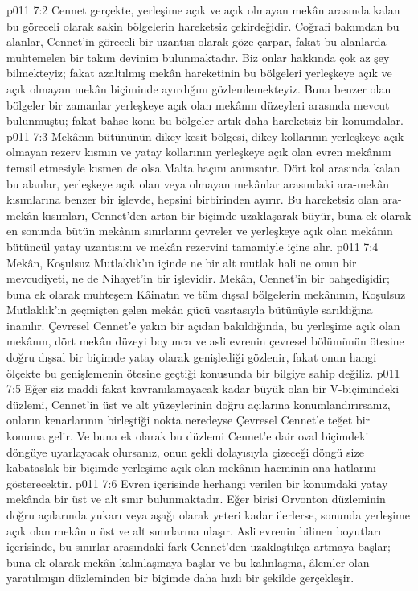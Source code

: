 \vs p011 7:2 Cennet gerçekte, yerleşime açık ve açık olmayan mekân arasında kalan bu göreceli olarak sakin bölgelerin hareketsiz çekirdeğidir. Coğrafi bakımdan bu alanlar, Cennet’in göreceli bir uzantısı olarak göze çarpar, fakat bu alanlarda muhtemelen bir takım devinim bulunmaktadır. Biz onlar hakkında çok az şey bilmekteyiz; fakat azaltılmış mekân hareketinin bu bölgeleri yerleşkeye açık ve açık olmayan mekân biçiminde ayırdığını gözlemlemekteyiz. Buna benzer olan bölgeler bir zamanlar yerleşkeye açık olan mekânın düzeyleri arasında mevcut bulunmuştu; fakat bahse konu bu bölgeler artık daha hareketsiz bir konumdalar.
\vs p011 7:3 Mekânın bütününün dikey kesit bölgesi, dikey kollarının yerleşkeye açık olmayan rezerv kısmın ve yatay kollarının yerleşkeye açık olan evren mekânını temsil etmesiyle kısmen de olsa Malta haçını anımsatır. Dört kol arasında kalan bu alanlar, yerleşkeye açık olan veya olmayan mekânlar arasındaki ara\hyp{}mekân kısımlarına benzer bir işlevde, hepsini birbirinden ayırır. Bu hareketsiz olan ara\hyp{}mekân kısımları, Cennet’den artan bir biçimde uzaklaşarak büyür, buna ek olarak en sonunda bütün mekânın sınırlarını çevreler ve yerleşkeye açık olan mekânın bütüncül yatay uzantısını ve mekân rezervini tamamiyle içine alır.
\vs p011 7:4 Mekân, Koşulsuz Mutlaklık’ın içinde ne bir alt mutlak hali ne onun bir mevcudiyeti, ne de Nihayet’in bir işlevidir. Mekân, Cennet’in bir bahşedişidir; buna ek olarak muhteşem Kâinatın ve tüm dışsal bölgelerin mekânının, Koşulsuz Mutlaklık’ın geçmişten gelen mekân gücü vasıtasıyla bütünüyle sarıldığına inanılır. Çevresel Cennet’e yakın bir açıdan bakıldığında, bu yerleşime açık olan mekânın, dört mekân düzeyi boyunca ve asli evrenin çevresel bölümünün ötesine doğru dışsal bir biçimde yatay olarak genişlediği gözlenir, fakat onun hangi ölçekte bu genişlemenin ötesine geçtiği konusunda bir bilgiye sahip değiliz.
\vs p011 7:5 Eğer siz maddi fakat kavranılamayacak kadar büyük olan bir V\hyp{}biçimindeki düzlemi, Cennet’in üst ve alt yüzeylerinin doğru açılarına konumlandırırsanız, onların kenarlarının birleştiği nokta neredeyse Çevresel Cennet’e teğet bir konuma gelir. Ve buna ek olarak bu düzlemi Cennet’e dair oval biçimdeki döngüye uyarlayacak olursanız, onun şekli dolayısıyla çizeceği döngü size kabataslak bir biçimde yerleşime açık olan mekânın hacminin ana hatlarını gösterecektir.
\vs p011 7:6 Evren içerisinde herhangi verilen bir konumdaki yatay mekânda bir üst ve alt sınır bulunmaktadır. Eğer birisi Orvonton düzleminin doğru açılarında yukarı veya aşağı olarak yeteri kadar ilerlerse, sonunda yerleşime açık olan mekânın üst ve alt sınırlarına ulaşır. Asli evrenin bilinen boyutları içerisinde, bu sınırlar arasındaki fark Cennet’den uzaklaştıkça artmaya başlar; buna ek olarak mekân kalınlaşmaya başlar ve bu kalınlaşma, âlemler olan yaratılmışın düzleminden bir biçimde daha hızlı bir şekilde gerçekleşir.
